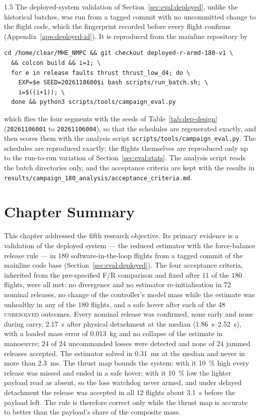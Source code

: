 \begin{spacing}{1.5}
The deployed-system validation of Section~\ref{sec:eval:deployed}, unlike the
historical batches, was run from a tagged commit with no uncommitted change to
the flight code, which the fingerprint recorded before every flight confirms
(Appendix~\ref{app:deployed-id}). It is reproduced from the mainline repository
by
\begin{footnotesize}
\begin{verbatim}
cd /home/clear/MHE_NMPC && git checkout deployed-r-armd-180-v1 \
  && colcon build && i=1; \
  for e in release faults thrust thrust_low_d4; do \
    EXP=$e SEED=2026110600$i bash scripts/run_batch.sh; \
    i=$((i+1)); \
  done && python3 scripts/tools/campaign_eval.py
\end{verbatim}
\end{footnotesize}
which flies the four segments with the seeds of Table~\ref{tab:dep-design}
(\texttt{20261106001} to \texttt{20261106004}), so that the schedules are
regenerated exactly, and then scores them with the analysis script
\texttt{scripts/tools/campaign\_eval.py}. The schedules are reproduced exactly;
the flights themselves are reproduced only up to the run-to-run variation of
Section~\ref{sec:eval:stats}. The analysis script reads the batch directories
only, and the acceptance criteria are kept with the results in
\texttt{results/campaign\_180\_analysis/acceptance\_criteria.md}.

\section{Chapter Summary}\label{sec:eval:summary}

This chapter addressed the fifth research objective. Its primary evidence is a
validation of the deployed system --- the reduced estimator with the
force-balance release rule --- in $180$ software-in-the-loop flights from a
tagged commit of the mainline code base (Section~\ref{sec:eval:deployed}). The
four acceptance criteria, inherited from the pre-specified F/R comparison and
fixed after $11$ of the $180$ flights, were all met: no divergence and no
estimator re-initialisation in $72$ nominal releases, no change of the
controller's model mass while the estimate was unhealthy in any of the $180$
flights, and a safe hover after each of the $48$ \textsc{unresolved} outcomes.
Every nominal release was confirmed, none early and none during carry,
\SI{2.17}{\second} after physical detachment at the median
(\SIrange{1.86}{2.52}{\second}), with a loaded mass error of
\SI{0.013}{\kg} and no collapse of the estimate in manoeuvre; $24$ of $24$
uncommanded losses were detected and none of $24$ jammed releases accepted. The
estimator solved in \SI{0.31}{\milli\second} at the median and never in more
than \SI{2.3}{\milli\second}. The thrust map bounds the system: with it
\SI{10}{\percent} high every release was missed and ended in a safe hover; with
it \SI{10}{\percent} low the lighter payload read as absent, so the loss
watchdog never armed, and under delayed detachment the release was accepted in
all $12$ flights about \SI{3.1}{\second} before the payload left. The rule is
therefore correct only while the thrust map is accurate to better than the
payload's share of the composite mass.


\end{spacing}
